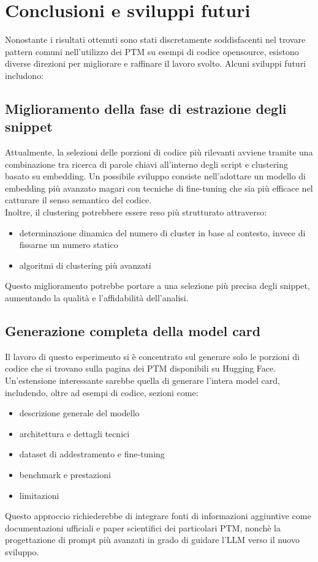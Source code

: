 \documentclass{article}
\begin{document}
\section{Conclusioni e sviluppi futuri}
Nonostante i risultati ottenuti sono stati discretamente soddisfacenti nel trovare pattern comuni nell'utilizzo dei PTM su esempi di codice opensource, esistono diverse direzioni per migliorare e raffinare il lavoro svolto. Alcuni sviluppi futuri includono:
\subsection{Miglioramento della fase di estrazione degli snippet}
Attualmente, la selezioni delle porzioni di codice più rilevanti avviene tramite una combinazione tra ricerca di parole chiavi all'interno degli script e clustering basato su embedding. Un possibile sviluppo consiste nell'adottare un modello di embedding più avanzato magari con tecniche di fine-tuning che sia più efficace nel catturare il senso semantico del codice.\\
Inoltre, il clustering potrebbere essere reso più strutturato attraverso:
\begin{itemize}
    \item determinazione dinamica del numero di cluster in base al contesto, invece di fissarne un numero statico
    \item algoritmi di clustering più avanzati 
\end{itemize}
Questo miglioramento potrebbe portare a una selezione più precisa degli snippet, aumentando la qualità e l’affidabilità dell’analisi.

\subsection{Generazione completa della model card}
Il lavoro di questo esperimento si è concentrato sul generare solo le porzioni di codice che si trovano sulla pagina dei PTM disponibili su Hugging Face. Un'estensione interessante sarebbe quella di generare l'intera model card, includendo, oltre ad esempi di codice, sezioni come:
\begin{itemize}
    \item descrizione generale del modello
    \item architettura e dettagli tecnici
    \item dataset di addestramento e fine-tuning
    \item benchmark e prestazioni
    \item limitazioni
\end{itemize}
Questo approccio richiederebbe di integrare fonti di informazioni aggiuntive come documentazioni ufficiali e paper scientifici dei particolari PTM, nonchè la progettazione di prompt più avanzati in grado di guidare l'LLM verso il nuovo sviluppo.
\end{document}
